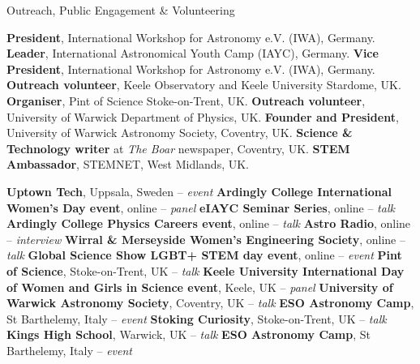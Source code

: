 \begin{rubric}{Outreach, Public Engagement \& Volunteering }

\entry*[2023 -- 2024]%
    \textbf{President}, International Workshop for Astronomy e.V. (IWA), Germany.
\entry*[2017 -- 2024]%
    \textbf{Leader}, International Astronomical Youth Camp (IAYC), Germany. 
\entry*[2021 -- 2023]%
    \textbf{Vice President}, International Workshop for Astronomy e.V. (IWA), Germany. 
\entry*[2019 -- 2022]%
    \textbf{Outreach volunteer}, Keele Observatory and Keele University Stardome, UK.
\entry*[2019 -- 2020]%
    \textbf{Organiser}, Pint of Science Stoke-on-Trent, UK.
\entry*[2017 -- 2018]%
    \textbf{Outreach volunteer}, University of Warwick Department of Physics, UK. 
\entry*[2016 -- 2018]%
    \textbf{Founder and President}, University of Warwick Astronomy Society, Coventry, UK.
\entry*[2016 -- 2018]%
    \textbf{Science \& Technology writer} at \textit{The Boar} newspaper, Coventry, UK.
\entry*[2016 -- 2018]%
    \textbf{STEM Ambassador}, STEMNET, West Midlands, UK.

\entry*[2024]%
    \textbf{Uptown Tech}, Uppsala, Sweden -- \textit{event}
\entry*[2022]%
    \textbf{Ardingly College International Women's Day event}, online -- \textit{panel}
\entry*[2021]%
    \textbf{eIAYC Seminar Series}, online -- \textit{talk}
\entry*[2021]%
    \textbf{Ardingly College Physics Careers event}, online -- \textit{talk}
\entry*[2021]%
    \textbf{Astro Radio}, online -- \textit{interview}
\entry*[2020]%
    \textbf{Wirral \& Merseyside Women's Engineering Society}, online -- \textit{talk}  
\entry*[2020]%
    \textbf{Global Science Show LGBT+ STEM day event}, online -- \textit{event}  
\entry*[2019]%
    \textbf{Pint of Science}, Stoke-on-Trent, UK -- \textit{talk} 
\entry*[2019]%
    \textbf{Keele University International Day of Women and Girls in Science event}, Keele, UK -- \textit{panel} 
\entry*[2019]%
    \textbf{University of Warwick Astronomy Society}, Coventry, UK -- \textit{talk} 
\entry*[2018]%
    \textbf{ESO Astronomy Camp}, St Barthelemy, Italy -- \textit{event}
\entry*[2018]%
    \textbf{Stoking Curiosity}, Stoke-on-Trent, UK -- \textit{talk}
\entry*[2018]%
    \textbf{Kings High School}, Warwick, UK -- \textit{talk} 
\entry*[2017]%
    \textbf{ESO Astronomy Camp}, St Barthelemy, Italy -- \textit{event}
    
\end{rubric}
